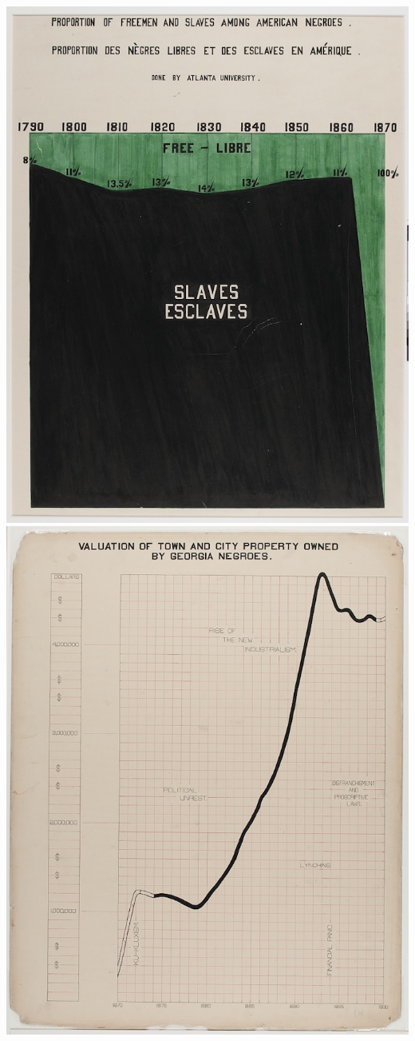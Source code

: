 \documentclass[]{book}
\theoremstyle{definition}
\theoremstyle{definition}
\theoremstyle{definition}
\theoremstyle{remark}
\begin{document}
\includegraphics{dubois1.jpg} \includegraphics{dubois2.jpg}
\end{document}
